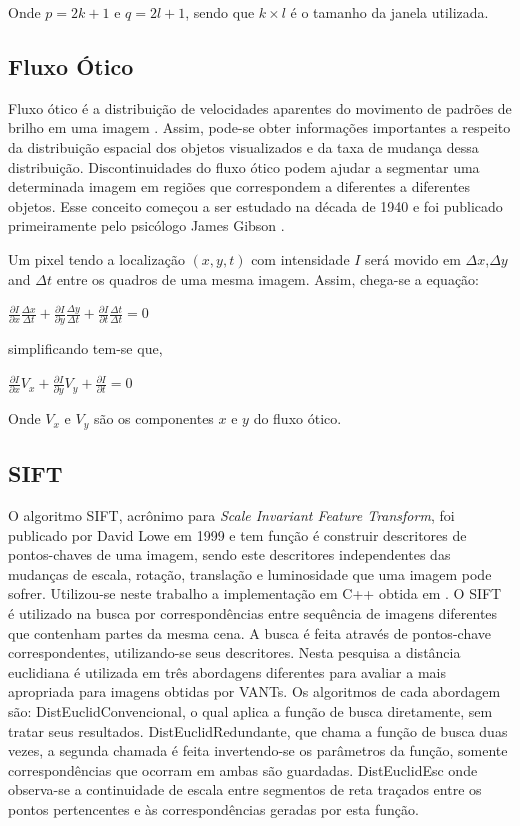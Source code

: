 \documentclass[9pt, a4paper, nofonttune, journal]{IEEEtran}
\begin{document}
    Onde $p = 2k + 1$ e $q = 2l + 1$, sendo que $k\times l$ é o tamanho da janela utilizada. 

\subsection{Fluxo Ótico}
Fluxo ótico é a distribuição de velocidades aparentes do movimento de padrões de brilho em uma imagem \cite{GibsonBook1}. Assim, pode-se obter informações importantes a respeito da distribuição espacial dos objetos visualizados 
e da taxa de mudança dessa distribuição. Discontinuidades do fluxo ótico podem ajudar a segmentar uma determinada imagem 
em regiões que correspondem a diferentes a diferentes objetos.
Esse conceito começou a ser estudado na década de 1940 e foi publicado primeiramente pelo psicólogo James Gibson \cite{Gibson1} \cite{OF1}.

Um pixel tendo a localização $(x,y,t)$ com intensidade $I$ será movido em $\Delta x$,$\Delta y$ and $\Delta t$ entre os quadros de uma mesma imagem.
Assim, chega-se a equação:

\begin{center}
$\frac{\partial I}{\partial x}\frac{\Delta x}{\Delta t}+\frac{\partial I}{\partial y}\frac{\Delta y}{\Delta t}+\frac{\partial I}{\partial t}\frac{\Delta t}{\Delta t} = 0 $\end{center}
simplificando tem-se que,
\begin{center}
$\frac{\partial I}{\partial x}V_x+\frac{\partial I}{\partial y}V_y+\frac{\partial I}{\partial t} = 0$\end{center}
Onde $V_x$ e $V_y$ são os componentes $x$ e $y$ do fluxo ótico.

\subsection{SIFT}

O algoritmo SIFT, acrônimo para \textit{Scale Invariant Feature Transform}, foi publicado por David Lowe \cite{Lowe2} em 1999 e tem função é construir descritores de pontos-chaves de uma imagem,
 sendo este descritores independentes das mudanças de escala, rotação, translação e luminosidade que uma imagem pode sofrer.
Utilizou-se neste trabalho a implementação em C++ obtida em \cite{Vedaldi}.
O SIFT é utilizado na busca por correspondências entre sequência de imagens diferentes que contenham partes da mesma cena. 
A busca é feita através de pontos-chave correspondentes, utilizando-se seus descritores. 
Nesta pesquisa a distância euclidiana é utilizada em três abordagens diferentes para avaliar a mais apropriada para imagens obtidas por VANTs. 
Os algoritmos de cada abordagem são: DistEuclidConvencional, o qual aplica a função de busca diretamente, sem tratar seus resultados. 
DistEuclidRedundante, que chama a função de busca duas vezes, a segunda chamada é feita invertendo-se os parâmetros da função, 
somente correspondências que ocorram em ambas são guardadas. 
DistEuclidEsc onde observa-se a continuidade de escala entre segmentos de reta traçados entre os pontos pertencentes e às correspondências geradas 
por esta função.
\end{document}
